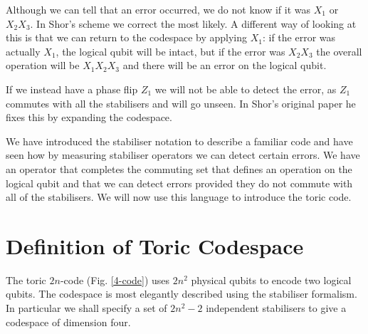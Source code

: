 Although we can tell that an error occurred, we do not know if it was $X_1$ or $X_2X_3$. In Shor's scheme we correct the most likely. A different way of looking at this is that we can return to the codespace by applying $X_1$: if the error was actually $X_1$, the logical qubit will be intact, but if the error was $X_2X_3$ the overall operation will be $X_1X_2X_3$ and there will be an error on the logical qubit.

If we instead have a phase flip $Z_1$ we will not be able to detect the error, as $Z_1$ commutes with all the stabilisers and will go unseen. In Shor's original paper he fixes this by expanding the codespace.

We have introduced the stabiliser notation to describe a familiar code and have seen how by measuring stabiliser operators we can detect certain errors. We have an operator that completes the commuting set that defines an operation on the logical qubit and that we can detect errors provided they do not commute with all of the stabilisers. We will now use this language to introduce the toric code.

\section{Definition of Toric Codespace}

The toric $2n$-code (Fig. \ref{4-code}) uses $2n^2$ physical qubits to encode two logical qubits. The codespace is most elegantly described using the stabiliser formalism. In particular we shall specify a set of $2n^2 - 2$ independent stabilisers to give a codespace of dimension four.

